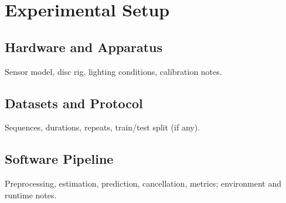 \chapter{Experimental Setup}\label{chap:setup}

\section{Hardware and Apparatus}
Sensor model, disc rig, lighting conditions, calibration notes.

\section{Datasets and Protocol}
Sequences, durations, repeats, train/test split (if any).

\section{Software Pipeline}
Preprocessing, estimation, prediction, cancellation, metrics; environment and runtime notes.
